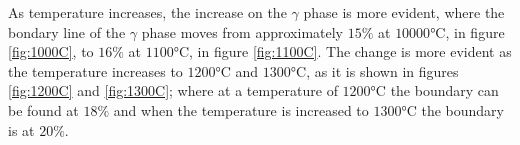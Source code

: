 As temperature increases, the increase on the $\gamma$ phase is more evident, where the bondary line of the $\gamma$ phase moves from approximately $15\%$ at $10000$°C, in figure \ref{fig:1000C}, to $16\%$ at $1100$°C, in figure \ref{fig:1100C}. The change is more evident as the temperature increases to $1200$°C and $1300$°C, as it is shown in figures \ref{fig:1200C} and \ref{fig:1300C}; where at a temperature of $1200$°C the boundary can be found at $18\%$ and when the temperature is increased to $1300$°C the boundary is at $20\%$.

\begin{figure}[H]
  \centering
  \ContinuedFloat
   \\
\end{figure}
